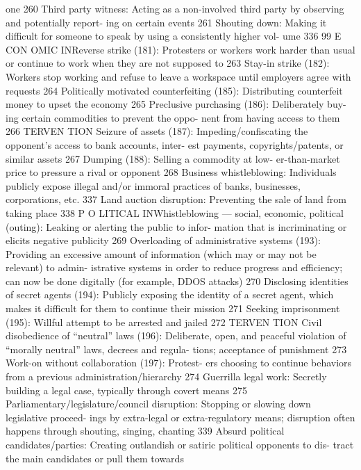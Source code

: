 \documentclass[twoside,a4paper,12pt,fleqn,openany]{extbook}
\begin{document}
one
 260
Third party witness: Acting as a non-involved
third party by observing and potentially report-
ing on certain events
 261
Shouting down: Making it difficult for someone
to speak by using a consistently higher vol-
ume
 336
99
E CON OMIC INReverse strike (181): Protesters or workers
work harder than usual or continue to work
when they are not supposed to
 263
Stay-in strike (182): Workers stop working and
refuse to leave a workspace until employers
agree with requests
 264
Politically motivated counterfeiting (185):
Distributing counterfeit money to upset the
economy
 265
Preclusive purchasing (186): Deliberately buy-
ing certain commodities to prevent the oppo-
nent from having access to them
 266
TERVEN TION
Seizure of assets (187): Impeding/confiscating
the opponent’s access to bank accounts, inter-
est payments, copyrights/patents, or similar
assets
 267
Dumping (188): Selling a commodity at low-
er-than-market price to pressure a rival or
opponent
 268
Business whistleblowing: Individuals publicly
expose illegal and/or immoral practices of
banks, businesses, corporations, etc.
 337
Land auction disruption: Preventing the sale
of land from taking place
 338
P O LITICAL INWhistleblowing — social, economic, political
(outing): Leaking or alerting the public to infor-
mation that is incriminating or elicits negative
publicity
 269
Overloading of administrative systems (193):
Providing an excessive amount of information
(which may or may not be relevant) to admin-
istrative systems in order to reduce progress
and efficiency; can now be done digitally (for
example, DDOS attacks)
 270
Disclosing identities of secret agents (194):
Publicly exposing the identity of a secret agent,
which makes it difficult for them to continue
their mission
 271
Seeking imprisonment (195): Willful attempt
to be arrested and jailed
 272
TERVEN TION
Civil disobedience of “neutral” laws (196):
Deliberate, open, and peaceful violation of
“morally neutral” laws, decrees and regula-
tions; acceptance of punishment
 273
Work-on without collaboration (197): Protest-
ers choosing to continue behaviors from a
previous administration/hierarchy
 274
Guerrilla legal work: Secretly building a legal
case, typically through covert means
 275
Parliamentary/legislature/council disruption:
Stopping or slowing down legislative proceed-
ings by extra-legal or extra-regulatory means;
disruption often happens through shouting,
singing, chanting
 339
Absurd political candidates/parties: Creating
outlandish or satiric political opponents to dis-
tract the main candidates or pull them towards
\end{document}
